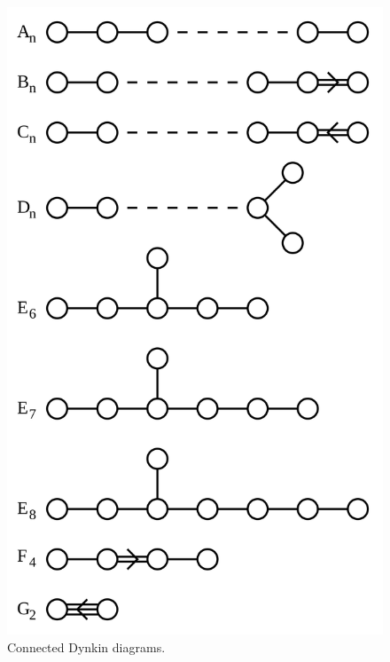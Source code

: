 \documentclass[10pt,a4paper,twoside,openany,hidelinks]{book}
\begin{document}
\begin{figure}[h!]
\centering
\caption{Connected Dynkin diagrams.}
\label{connected_dynkin_diagrams}
\includegraphics[scale=0.1]{sources/connected_dynkin_diagrams}
\end{figure}
\end{document}
